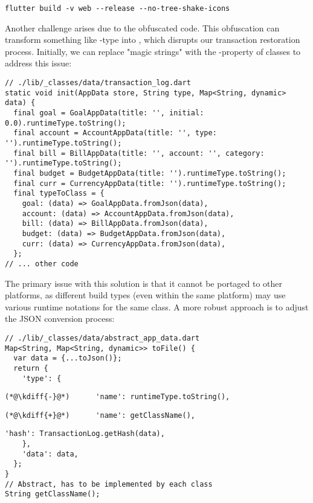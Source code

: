 \begin{lstlisting}[language=terminal]
flutter build -v web --release --no-tree-shake-icons
\end{lstlisting}

\noindent Another challenge arises due to the obfuscated code. This obfuscation can transform something like 
-type into , which disrupts our transaction restoration process. Initially, we can 
replace "magic strings" with the -property of classes to address this issue:

\begin{lstlisting}
// ./lib/_classes/data/transaction_log.dart
static void init(AppData store, String type, Map<String, dynamic> data) {
  final goal = GoalAppData(title: '', initial: 0.0).runtimeType.toString();
  final account = AccountAppData(title: '', type: '').runtimeType.toString();
  final bill = BillAppData(title: '', account: '', category: '').runtimeType.toString();
  final budget = BudgetAppData(title: '').runtimeType.toString();
  final curr = CurrencyAppData(title: '').runtimeType.toString();
  final typeToClass = {
    goal: (data) => GoalAppData.fromJson(data),
    account: (data) => AccountAppData.fromJson(data),
    bill: (data) => BillAppData.fromJson(data),
    budget: (data) => BudgetAppData.fromJson(data),
    curr: (data) => CurrencyAppData.fromJson(data),
  };
// ... other code
\end{lstlisting}

\noindent The primary issue with this solution is that it cannot be portaged to other platforms, as different build 
types (even within the same platform) may use various runtime notations for the same class. A more robust approach is 
to adjust the JSON conversion process:

\begin{lstlisting}
// ./lib/_classes/data/abstract_app_data.dart
Map<String, Map<String, dynamic>> toFile() {
  var data = {...toJson()};
  return {
    'type': {
\end{lstlisting}
{
\xpretocmd{\lstlisting}{\vspace{-12pt}}{}{}
\begin{lstlisting}[firstnumber=6, backgroundcolor=\color{backred}]
(*@\kdiff{-}@*)      'name': runtimeType.toString(),
\end{lstlisting}
\begin{lstlisting}[firstnumber=6, backgroundcolor=\color{backgreen}]
(*@\kdiff{+}@*)      'name': getClassName(),
\end{lstlisting}
\begin{lstlisting}[firstnumber=7]
      'hash': TransactionLog.getHash(data),
    },
    'data': data,
  };
}
// Abstract, has to be implemented by each class
String getClassName();
\end{lstlisting}
}

